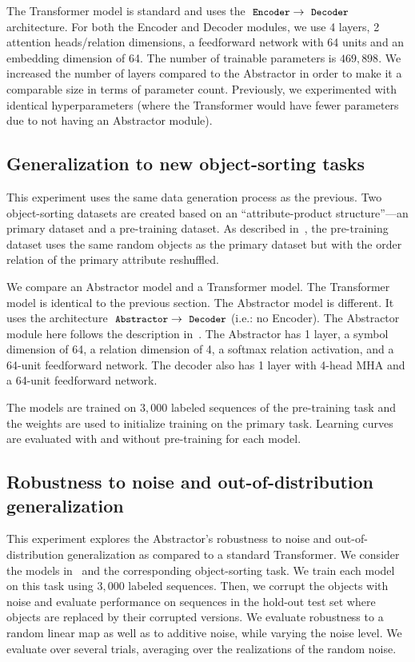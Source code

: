The Transformer model is standard and uses the $\module{Encoder} \to \module{Decoder}$ architecture. For both the Encoder and Decoder modules, we use 4 layers, 2 attention heads/relation dimensions, a feedforward network with 64 units and an embedding dimension of 64. The number of trainable parameters is $469,898$. We increased the number of layers compared to the Abstractor in order to make it a comparable size in terms of parameter count. Previously, we experimented with identical hyperparameters (where the Transformer would have fewer parameters due to not having an Abstractor module).

\subsection{Generalization to new object-sorting tasks}\label{ssec:supp_exp_object_sorting_generalization}
This experiment uses the same data generation process as the previous. Two object-sorting datasets are created based on an ``attribute-product structure''---an primary dataset and a pre-training dataset. As described in~, the pre-training dataset uses the same random objects as the primary dataset but with the order relation of the primary attribute reshuffled.

We compare an Abstractor model and a Transformer model. The Transformer model is identical to the previous section. The Abstractor model is different. It uses the architecture $\module{Abstractor} \to \module{Decoder}$ (i.e.: no Encoder). The Abstractor module here follows the description in~. The Abstractor has 1 layer, a symbol dimension of 64, a relation dimension of 4, a softmax relation activation, and a 64-unit feedforward network. The decoder also has 1 layer with 4-head MHA and a 64-unit feedforward network.

The models are trained on $3,000$ labeled sequences of the pre-training task and the weights are used to initialize training on the primary task. Learning curves are evaluated with and without pre-training for each model.

\subsection{Robustness to noise and out-of-distribution generalization}
This experiment explores the Abstractor's robustness to noise and out-of-distribution generalization as compared to a standard Transformer. We consider the models in~ and the corresponding object-sorting task. We train each model on this task using $3,000$ labeled sequences. Then, we corrupt the objects with noise and evaluate performance on sequences in the hold-out test set where objects are replaced by their corrupted versions. We evaluate robustness to a random linear map as well as to additive noise, while varying the noise level. We evaluate over several trials, averaging over the realizations of the random noise.

